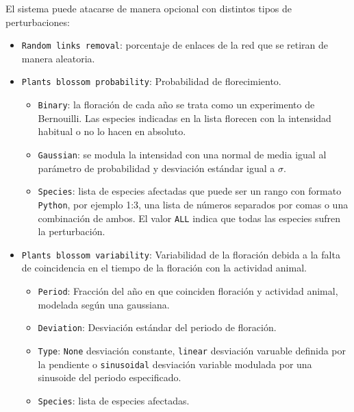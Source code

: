 El sistema puede atacarse de manera opcional con distintos tipos de perturbaciones:
\begin{itemize}
\item \texttt{Random links removal}: porcentaje de enlaces de la red que se retiran de manera aleatoria.

\item \texttt{Plants blossom probability}: Probabilidad de florecimiento. 

\begin{itemize}
	\item \texttt{Binary}: la floración de cada año se trata como un experimento de Bernouilli. Las especies indicadas en la lista florecen con la intensidad habitual o no lo hacen en absoluto.

    \item \texttt{Gaussian}: se modula la intensidad con una normal de media igual al parámetro de probabilidad y desviación estándar igual a $\sigma$.
    
    \item \texttt{Species}: lista de especies afectadas que puede ser un rango con formato \texttt{Python}, por ejemplo 1:3, una lista de números separados por comas o una combinación de ambos. El valor \texttt{ALL} indica que todas las especies sufren la perturbación.
\end{itemize}

\item \texttt{Plants blossom variability}: Variabilidad de la floración debida a la falta de coincidencia en el tiempo de la floración con la actividad animal.
\begin{itemize}
	\item \texttt{Period}: Fracción del año en que coinciden floración y actividad animal, modelada según una gaussiana.

    \item \texttt{Deviation}: Desviación estándar del periodo de floración.
    
    \item \texttt{Type}:  \texttt{None} desviación constante, \texttt{linear} desviación varuable definida por la pendiente o \texttt{sinusoidal} desviación variable modulada por una sinusoide del periodo especificado.
    
    \item \texttt{Species}: lista de especies afectadas.
\end{itemize}

\end{itemize}

